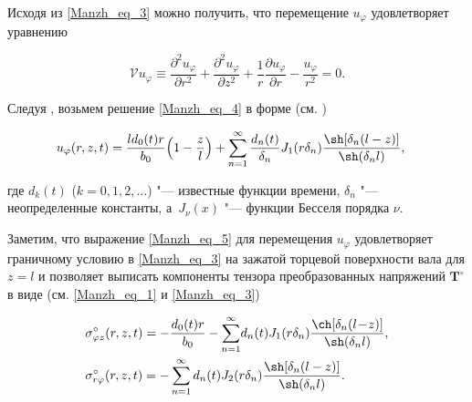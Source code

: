 Исходя из \eqref{Manzh_eq_3} можно получить, что перемещение $u_\varphi$ удовлетворяет уравнению

\begin{equation}\label{Manzh_eq_4}%

  \boldsymbol{\mathcal V}u_\varphi \equiv \frac{\partial^2u_\varphi}{\partial r^2}+\frac{\partial^2u_\varphi}{\partial z^2}+\frac1r\frac{\partial u_\varphi}{\partial r}-\frac{u_\varphi}{r^2}=0.

\end{equation}



Следуя \cite{Manzh_bib_10}, возьмем решение \eqref{Manzh_eq_4} в форме (см. \cite{Manzh_bib_04})

\begin{align}\label{Manzh_eq_5}%

  & 

  u_\varphi(r,z,t)=\frac{ld_0(t)r}{b_0}\Bigl(1-\frac zl\Bigr)

  +\sum_{n=1}^\infty\frac{d_n(t)}{\delta_n}J_1(r\delta_n)\frac{\sh[\delta_n(l-z)]}{\sh(\delta_nl)},

\end{align}

где $d_k(t)$ ($k=0,1,2,\dots$)  "--- известные функции времени, $\delta_n$ "--- неопределенные константы, \linebreak а~$J_\nu(x)$ "--- функции Бесселя порядка $\nu$.



Заметим, что выражение \eqref{Manzh_eq_5} для перемещения $u_\varphi$ удовлетворяет граничному условию в \eqref{Manzh_eq_3} на зажатой торцевой поверхности вала для $z=l$ и позволяет выписать  компоненты тензора преобразованных напряжений $\mathbf T^\circ$ в виде (см. \eqref{Manzh_eq_1} и \eqref{Manzh_eq_3})

\begin{align}\label{Manzh_eq_6}%

\begin{aligned}

  &

  \sigma_{\varphi z}^\circ(r,z,t) = - \frac{d_0(t)r}{b_0}

  -\sum_{n=1}^\infty\!d_n(t)J_1(r\delta_n)\frac{\ch[\delta_n(l\!-\!z)]}{\sh(\delta_nl)},

\\

  &

  \sigma_{r\varphi}^\circ(r,z,t)

  =-\sum_{n=1}^\infty d_n(t)J_2(r\delta_n)\frac{\sh[\delta_n(l-z)]}{\sh(\delta_nl)}.

\end{aligned}

\end{align}



